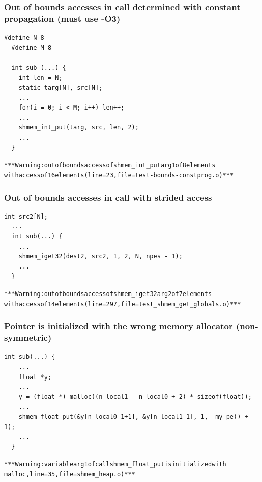 \subsubsection{Out of bounds accesses in \openshmem call determined with constant propagation (must use -O3)}

\begin{lstlisting}[language=OSH+C]
  #define N 8
  #define M 8

  int sub (...) {
    int len = N;
    static targ[N], src[N];
    ...
    for(i = 0; i < M; i++) len++;
    ...
    shmem_int_put(targ, src, len, 2);
    ...
  }     
\end{lstlisting}
\begin{alltt}
  *** \openshmem Warning: out of bounds access of shmem_int_put arg1 of 8 elements 
  with access of 16 elements (line=23, file=test-bounds-constprog.o) ***
\end{alltt}

\subsubsection{Out of bounds accesses in \openshmem call with strided access}

\begin{lstlisting}[language=OSH+C]
  int src2[N];
  ...
  int sub(...) {
    ...
    shmem_iget32(dest2, src2, 1, 2, N, npes - 1);
    ...
  }
\end{lstlisting}
\begin{alltt}
  *** \openshmem Warning: out of bounds access of shmem_iget32 arg2 of 7 elements 
  with access of 14 elements (line=297, file=test_shmem_get_globals.o) ***
\end{alltt}

\subsubsection{Pointer is initialized with the wrong memory allocator (non-symmetric)}

\begin{lstlisting}[language=OSH+C]
  int sub(...) {
    ...
    float *y;
    ...
    y = (float *) malloc((n_local1 - n_local0 + 2) * sizeof(float));
    ...
    shmem_float_put(&y[n_local0-1+1], &y[n_local1-1], 1, _my_pe() + 1);
    ...
  } 
\end{lstlisting}
\begin{alltt}
  *** \openshmem Warning: variable arg1 of call shmem_float_put is initialized with 
  malloc, line=35, file=shmem\_heap.o) ***
\end{alltt}

